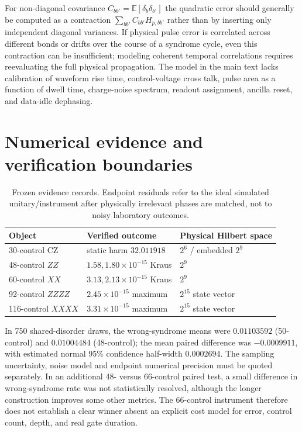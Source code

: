 \documentclass[aps,prx,onecolumn,10pt]{revtex4-2}
\begin{document}
For non-diagonal covariance $C_{bb'}=\mathbb E[\delta_b\delta_{b'}]$ the quadratic error should generally be computed as a contraction $\sum_{bb'}C_{bb'}H_{p,bb'}$ rather than by inserting only independent diagonal variances. If physical pulse error is correlated across different bonds or drifts over the course of a syndrome cycle, even this contraction can be insufficient; modeling coherent temporal correlations requires reevaluating the full physical propagation. The model in the main text lacks calibration of waveform rise time, control-voltage cross talk, pulse area as a function of dwell time, charge-noise spectrum, readout assignment, ancilla reset, and data-idle dephasing.

\section{Numerical evidence and verification boundaries}
\begin{table}[h]
\caption{Frozen evidence records. Endpoint residuals refer to the ideal simulated unitary/instrument after physically irrelevant phases are matched, not to noisy laboratory outcomes.}
\begin{ruledtabular}\begin{tabular}{lll}
Object & Verified outcome & Physical Hilbert space\\\hline
30-control CZ & static harm $32.011918$ & $2^6$ / embedded $2^9$\\
48-control $ZZ$ & $1.58,1.80\times10^{-15}$ Kraus & $2^9$\\
60-control $XX$ & $3.13,2.13\times10^{-15}$ Kraus & $2^9$\\
92-control $ZZZZ$ & $2.45\times10^{-15}$ maximum & $2^{15}$ state vector\\
116-control $XXXX$ & $3.31\times10^{-15}$ maximum & $2^{15}$ state vector\\
\end{tabular}\end{ruledtabular}
\end{table}
In 750 shared-disorder draws, the wrong-syndrome means were $0.01103592$ (50-control) and $0.01004484$ (48-control); the mean paired difference was $-0.0009911$, with estimated normal 95\% confidence half-width $0.0002694$. The sampling uncertainty, noise model and endpoint numerical precision must be quoted separately. In an additional 48- versus 66-control paired test, a small difference in wrong-syndrome rate was not statistically resolved, although the longer construction improves some other metrics. The 66-control instrument therefore does not establish a clear winner absent an explicit cost model for error, control count, depth, and real gate duration.
\end{document}
